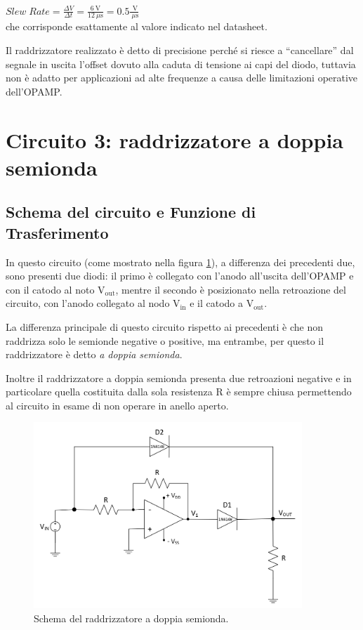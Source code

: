\documentclass{report}
\begin{document}
\\[2pt]\indent $\displaystyle{Slew\;Rate=\frac{\Delta V}{\Delta t}=\frac{\SI{6}{\volt}}{\SI{12}{\mu\second}}=0.5\frac{\SI{}{\volt}}{\SI{}{\mu\second}}}$
\\[2pt] che corrisponde esattamente al valore indicato nel datasheet. \par
Il raddrizzatore realizzato è detto di precisione perché si riesce a ``cancellare'' dal segnale in uscita l'offset dovuto alla caduta di tensione ai capi del diodo, tuttavia non è adatto per applicazioni ad alte frequenze a causa delle limitazioni operative dell'OPAMP. 
\newpage
\section{Circuito 3: raddrizzatore a doppia semionda}
\subsection{Schema del circuito e Funzione di Trasferimento}
In questo circuito (come mostrato nella figura \ref{figura:schema3}), a differenza dei precedenti due, sono presenti due diodi: il primo è collegato con l'anodo all'uscita dell'OPAMP e con il catodo al noto $\displaystyle\mathrm{V_{out}}$, mentre il secondo è posizionato nella retroazione del circuito, con l'anodo collegato al nodo $\displaystyle\mathrm{V_{in}}$ e il catodo a $\displaystyle\mathrm{V_{out}}$.\par
La differenza principale di questo circuito rispetto ai precedenti è che non raddrizza solo le semionde negative o positive, ma entrambe, per questo il raddrizzatore è detto \textit{a doppia semionda}. \par
Inoltre il raddrizzatore a doppia semionda presenta due retroazioni negative e in particolare quella costituita dalla sola resistenza R è sempre chiusa permettendo al circuito in esame di non operare in anello aperto.\par
\begin{figure}[h]
	\centering
	\includegraphics[height=7cm]{immagini/schema3}
	\caption{Schema del raddrizzatore a doppia semionda.}
	\label{figura:schema3}
\end{figure}
\end{document}
